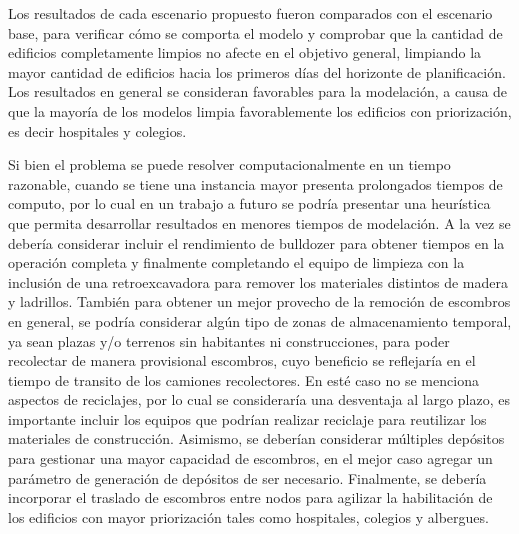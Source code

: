 \documentclass[letterpaper,conference]{IEEEtran}
\begin{document}
Los resultados de cada escenario propuesto fueron comparados con el escenario base, para verificar cómo se comporta el modelo y comprobar que la cantidad de edificios completamente limpios no afecte en el objetivo general, limpiando la mayor cantidad de edificios hacia los primeros días del horizonte de planificación. Los resultados en general se consideran favorables para la modelación, a causa de que la mayoría de los modelos limpia favorablemente los edificios con priorización, es decir hospitales y colegios.

Si bien el problema se puede resolver computacionalmente en un tiempo razonable, cuando se tiene una instancia mayor presenta prolongados tiempos de computo, por lo cual en un trabajo a futuro se podría presentar una heurística que permita desarrollar resultados en menores tiempos de modelación. A la vez se debería considerar incluir el rendimiento de bulldozer para obtener tiempos en la operación completa y finalmente completando el equipo de limpieza con la inclusión de una retroexcavadora para remover los materiales distintos de madera y ladrillos. También para obtener un mejor provecho de la remoción de escombros en general, se podría considerar algún tipo de zonas de almacenamiento temporal, ya sean plazas y/o terrenos sin habitantes ni construcciones, para poder recolectar de manera provisional escombros, cuyo beneficio se reflejaría en el tiempo de transito de los camiones recolectores. En esté caso no se menciona aspectos de reciclajes, por lo cual se consideraría una desventaja al largo plazo, es importante incluir los equipos que podrían realizar reciclaje para reutilizar los materiales de construcción.  Asimismo, se deberían considerar múltiples depósitos para gestionar una mayor capacidad de escombros, en el mejor caso agregar un parámetro de generación de depósitos de ser necesario. Finalmente, se debería incorporar el traslado de escombros entre nodos para agilizar la habilitación de los edificios con mayor priorización tales como hospitales, colegios y albergues.
\end{document}
